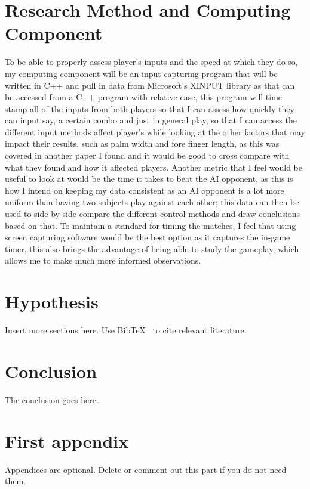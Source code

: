 \documentclass[journal]{IEEEtran}
\begin{document}
\section{Research Method and Computing Component}
To be able to properly assess player's inputs and the speed at which they do so, my computing component will be an input capturing program that will be written in C++ and pull in data from Microsoft's XINPUT library as that can be accessed from a C++ program with relative ease, this program will time stamp all of the inputs from both players so that I can assess how quickly they can input say, a certain combo and just in general play, so that I can access the different input methods affect player's while looking at the other factors that may impact their results, such as palm width and fore finger length, as this was covered in another paper I found\cite{omichands} and it would be good to cross compare with what they found and how it affected players. Another metric that I feel would be useful to look at would be the time it takes to beat the AI opponent, as this is how I intend on keeping my data consistent as an AI opponent is a lot more uniform than having two subjects play against each other; this data can then be used to side by side compare the different control methods and draw conclusions based on that. To maintain a standard for timing the matches, I feel that using screen capturing software would be the best option as it captures the in-game timer, this also brings the advantage of being able to study the gameplay, which allows me to make much more informed observations.

\section{Hypothesis}

Insert more sections here.
Use BibTeX~\cite{bibtex} to cite relevant literature.

\section{Conclusion}
The conclusion goes here.






\appendices
\section{First appendix}
Appendices are optional. Delete or comment out this part if you do not need them.

\end{document}
